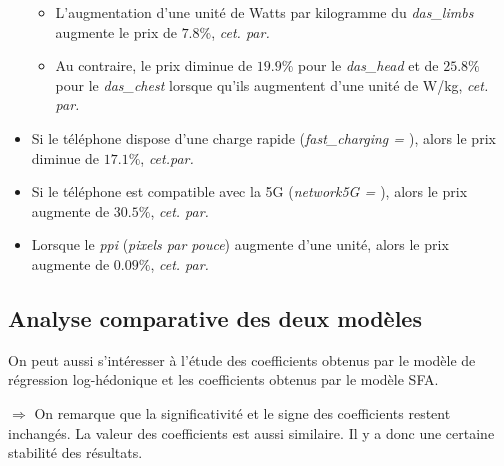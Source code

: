 \documentclass[
  12pt,
]{report}
\providecommand{\tightlist}{%
  \setlength{\itemsep}{0pt}\setlength{\parskip}{0pt}}\usepackage{longtable,booktabs,array}
\renewcommand{\texttt}[1]{\colorbox{light}{\color{highlight}{\ttfamily{#1}}}}
\begin{document}
\begin{itemize}
  \begin{itemize}
  \tightlist
  \item
    L'augmentation d'une unité de Watts par kilogramme du
    \emph{das\_limbs} augmente le prix de \(7.8\%\), \emph{cet. par.}
  \item
    Au contraire, le prix diminue de \(19.9\%\) pour le \emph{das\_head}
    et de \(25.8\%\) pour le \emph{das\_chest} lorsque qu'ils augmentent
    d'une unité de W/kg, \emph{cet. par.}
  \end{itemize}
\item
  Si le téléphone dispose d'une charge rapide (\emph{fast\_charging =
  \texttt{TRUE}}), alors le prix diminue de \(17.1\%\), \emph{cet.par.}
\item
  Si le téléphone est compatible avec la 5G (\emph{network5G =
  \texttt{TRUE}}), alors le prix augmente de \(30.5\%\), \emph{cet.
  par.}
\item
  Lorsque le \emph{ppi} (\emph{pixels par pouce}) augmente d'une unité,
  alors le prix augmente de \(0.09\%\), \emph{cet. par.}
\end{itemize}

\newpage

\subsection{Analyse comparative des deux
modèles}\label{analyse-comparative-des-deux-moduxe8les}

On peut aussi s'intéresser à l'étude des coefficients obtenus par le
modèle de régression log-hédonique et les coefficients obtenus par le
modèle SFA.

\(\Rightarrow\) On remarque que la significativité et le signe des
coefficients restent inchangés. La valeur des coefficients est aussi
similaire. Il y a donc une certaine stabilité des résultats.
\end{document}
